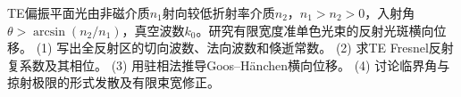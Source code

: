 TE偏振平面光由非磁介质\(n_1\)射向较低折射率介质\(n_2\)，\(n_1>n_2>0\)，入射角\(\theta>\arcsin(n_2/n_1)\)，真空波数\(k_0\)。研究有限宽度准单色光束的反射光斑横向位移。
(1) 写出全反射区的切向波数、法向波数和倏逝常数。
(2) 求TE Fresnel反射复系数及其相位。
(3) 用驻相法推导Goos–Hänchen横向位移。
(4) 讨论临界角与掠射极限的形式发散及有限束宽修正。
